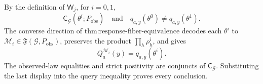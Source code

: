 By the definition of \(\mathsf W_j\), for \(i=0,1\),
\[
\mathsf C_{\mathcal G}(\theta^i;P_{\mathrm{obs}})
\quad\text{and}\quad
q_{a,y}(\theta^0)\neq q_{a,y}(\theta^1).
\]
The converse direction of \(\text{thm:response-fiber-equivalence}\) decodes each \(\theta^i\) to \(\mathcal M_i\in\mathfrak F(\mathcal G,P_{\mathrm{obs}})\), preserves the product \(\prod_h\rho_h^i\), and gives
\[
Q_a^{\mathcal M_i}(y)=q_{a,y}(\theta^i).
\]
The observed-law equalities and strict positivity are conjuncts of \(\mathsf C_{\mathcal G}\). Substituting the last display into the query inequality proves every conclusion.